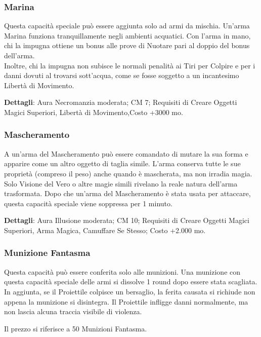 \begin{multicols}{2}
\subsubsection{Marina}

Questa capacità speciale può essere aggiunta solo ad armi da mischia. Un'arma Marina funziona tranquillamente negli ambienti acquatici. Con l'arma in mano, chi la impugna ottiene un bonus alle prove di Nuotare pari al doppio del bonus dell'arma. \\
Inoltre, chi la impugna non subisce le normali penalità ai Tiri per Colpire e per i danni dovuti al trovarsi sott'acqua, come se fosse soggetto a un incantesimo Libertà di Movimento.

\textbf{Dettagli}: Aura Necromanzia moderata; CM 7; Requisiti di Creare Oggetti Magici Superiori, Libertà di Movimento,Costo +3000 mo.

\subsubsection{Mascheramento}

A un'arma del Mascheramento può essere comandato di mutare la sua forma e apparire come un altro oggetto di taglia simile. L'arma conserva tutte le sue proprietà (compreso il peso) anche quando è mascherata, ma non irradia magia. Solo Visione del Vero o altre magie simili rivelano la reale natura dell'arma trasformata. Dopo che un'arma del Mascheramento è stata usata per attaccare, questa capacità speciale viene soppressa per 1 minuto.

\textbf{Dettagli}: Aura Illusione moderata; CM 10; Requisiti di Creare Oggetti Magici Superiori, Arma Magica, Camuffare Se Stesso; Costo +2.000 mo.

\subsubsection{Munizione Fantasma}

Questa capacità può essere conferita solo alle munizioni. Una munizione con questa capacità speciale delle armi si dissolve 1 round dopo essere stata scagliata. In aggiunta, se il Proiettile colpisce un bersaglio, la ferita causata si richiude non appena la munizione si disintegra. Il Proiettile infligge danni normalmente, ma non lascia alcuna traccia visibile di violenza.

Il prezzo si riferisce a 50 Munizioni Fantasma.


\end{multicols}
